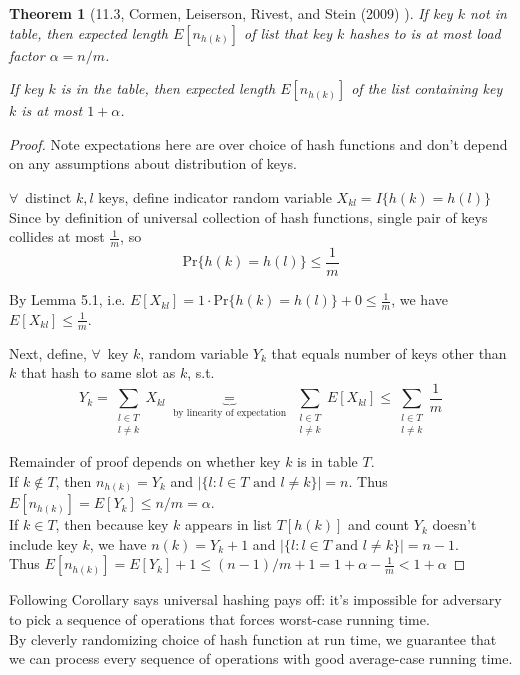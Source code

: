 \documentclass[10pt]{amsart}
\newtheorem{theorem}{Theorem}
\begin{document}
\begin{multicols*}{2}
\begin{theorem}[11.3, Cormen, Leiserson, Rivest, and Stein (2009) \cite{CLRS2009}]
If key $k$ not in table, then expected length $E[n_{h(k)}]$ of list that key $k$ hashes to is at most load factor $\alpha = n/m$.

If key $k$ is in the table, then expected length $E[n_{h(k)}]$ of the list containing key $k$ is at most $1+\alpha$.
\end{theorem}

\begin{proof}
Note expectations here are over choice of hash functions and don't depend on any assumptions about distribution of keys.

$\forall \, $ distinct $k, l$ keys, define indicator random variable $X_{kl} = I\lbrace h(k) = h(l) \rbrace$ \\
Since by definition of universal collection of hash functions, single pair of keys collides at most $\frac{1}{m}$, so
\[
\text{Pr}\lbrace h(k) = h(l) \rbrace \leq \frac{1}{m}
\]

By Lemma 5.1, i.e. $E[X_{kl}] = 1 \cdot \text{Pr}\lbrace h(k) = h(l) \rbrace + 0 \leq \frac{1}{m}$, we have $E[X_{kl}] \leq \frac{1}{m}$.

Next, define, $\forall \,$ key $k$, random variable $Y_k$ that equals number of keys other than $k$ that hash to same slot as $k$, s.t. 
\[
Y_k = \sum_{\substack{l \in T \\ l \neq k} } X_{kl} \underbrace{=}_{\text{ by linearity of expectation }} \sum_{ \substack{l \in T \\ l \neq k }} E[X_{kl}] \leq \sum_{ \substack{ l \in T \\ l \neq k } } \frac{1}{m}
\]

Remainder of proof depends on whether key $k$ is in table $T$. \\
If $k \notin T$, then $n_{h(k)} = Y_k$ and $| \lbrace l : l \in T \text{ and } l\neq k \rbrace | = n$. Thus $E[n_{h(k)}] = E[Y_k] \leq n /m = \alpha$. \\
If $k \in T$, then because key $k$ appears in list $T[h(k)]$ and count $Y_k$ doesn't include key $k$, we have $n(k) = Y_k + 1$ and $| \lbrace l : l \in T \text{ and } l \neq k \rbrace | = n-1$. \\
Thus $E [n_{h(k)}] = E[Y_k] + 1 \leq (n-1) / m + 1 = 1 + \alpha - \frac{1}{m} < 1 + \alpha$

\end{proof}

Following Corollary says universal hashing pays off: it's impossible for adversary to pick a sequence of operations that forces worst-case running time.  \\
By cleverly randomizing choice of hash function at run time, we guarantee that we can process every sequence of operations with good average-case running time.


\end{multicols*}
\end{document}
